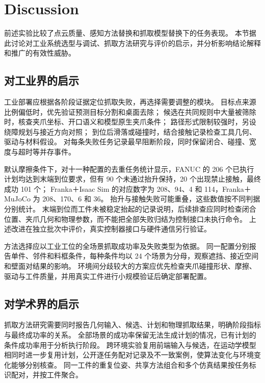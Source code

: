 \documentclass[UTF8,fontset=fandol,a4paper,11pt]{ctexart}
\newcommand{\qyb}[1]{#1}
\begin{document}
\section{\qyb{Discussion}}
\label{sec:discussion}

前述实验比较了点云质量、感知方法替换和抓取模型替换下的任务表现。
本节据此讨论对工业系统选型与调试、抓取方法研究与评价的启示，并分析影响结论解释和推广的有效性威胁。

\subsection{\qyb{对工业界的启示}}

工业部署应根据各阶段证据定位抓取失败，再选择需要调整的模块。
目标点来源比例偏低时，优先验证预测目标分割和桌面去除；
候选在共同规则中大量被筛除时，核查夹爪坐标、开口语义和模型原生夹爪条件；
路径形式限制较强时，另设绕障规划与接近方向对照；
到位后滑落或碰撞时，结合接触记录检查工具几何、驱动与材料假设。
对每条失败任务记录最早阻断阶段，同时保留闭合、碰撞、宽度与超时等并存事件。

默认摩擦条件下，对十一种配置的去重任务统计显示，FANUC 的 206 个已执行计划均达到末端到位要求，但有 90 个未通过抬升保持，20 个出现禁止接触，最终成功 101 个；
Franka＋Isaac Sim 的对应数字为 208、94、4 和 114，Franka＋MuJoCo 为 208、170、6 和 36。
抬升与接触失败可能重叠，这些数值按不同判据分别统计。
末端到位而工件未被稳定抬起的记录说明，后续排查应同时检查闭合位置、夹爪几何和物理参数，而不能把全部失败归结为控制接口未执行命令。
上述改进在独立批次中评价，真实控制器接口与硬件通信另行验证。

方法选择应以工业工位的全场景抓取成功率及失败类型为依据。
同一配置分别报告单件、邻件和料框条件，每种条件均以 24 个场景为分母，观察遮挡、接近空间和壁面对结果的影响。
环境间分歧较大的方案应优先检查夹爪碰撞形状、摩擦、驱动与工件质量，并用真实工件进行小规模验证后确定部署配置。

\subsection{\qyb{对学术界的启示}}

抓取方法研究需要同时报告几何输入、候选、计划和物理抓取结果，明确阶段指标与最终成功率的关系。
全部场景的成功率保留无法生成计划的情况，已有计划的条件成功率用于分析执行阶段。
跨环境实验复用前端输入与候选，在运动学模型相同时进一步复用计划，公开逐任务配对记录及不一致案例，使算法变化与环境变化能够分别核查。
同一工件的重复位姿、共享方法组合和多个仿真结果按任务标识配对，并按工件聚合。
\end{document}
